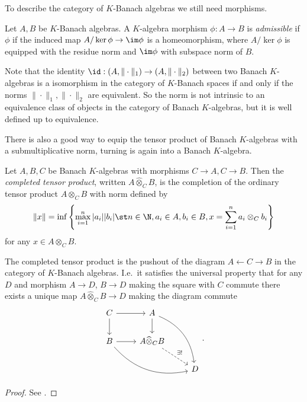 To describe the category of $K$-Banach algebras we still need morphisms.
\begin{definition}
	Let $A, B$ be $K$-Banach algebras. 
	A $K$-algebra morphism $\phi: A \to B$ is \emph{admissible} if $\phi$ if the induced map $A / \ker \phi \to \im \phi$ is a homeomorphism, where $A / \ker \phi$ is equipped with the residue norm and $\im \phi$ with subspace norm of $B$. 
\end{definition}

\begin{remark}\label{rem:uniqueness_norm_banach_algebra}
	Note that the identity  $\id: (A, \|\cdot \|_1) \to (A, \|\cdot \|_2)$ between two Banach $K$-algebras is a isomorphism in the category of $K$-Banach spaces if and only if the norms $\|\cdot \|_1, \|\cdot \|_2$ are equivalent. 
	So the norm is not intrinsic to an equivalence class of objects in the category of Banach  $K$-algebras, but it is well defined up to equivalence. 
\end{remark}

There is also a good way to equip the tensor product of Banach $K$-algebras with a submultiplicative norm, turning is again into a Banach $K$-algebra.
\begin{definition}
	Let $A, B, C$ be Banach $K$-algebras with morphisms  $C\to A, C \to B$. Then the \emph{completed tensor product}, written $A \widehat \otimes_C B$, is the completion of the ordinary tensor product $A \otimes_C B$ with norm defined by \[
		\|x\| = \inf \left\{\max_{i = 1}^{n} |a_i||b_i|  \st n \in \N, a_i \in A, b_i \in B, x = \sum_{i = 1}^{n} a_i \otimes_C b_i\right\} 
	\] 
	for any $x \in A \otimes_C B$. 
\end{definition}

\begin{proposition}\label{prop:universal_prop_complete_tensor}
	The completed tensor product is the pushout of the diagram $A \leftarrow C \to B$ in the category of  $K$-Banach algebras. I.e.\ it satisfies the universal property that for any  $D$ and morphism $A \to D$,  $B \to D$ making the square with $C$ commute there exists a unique map $A \widehat\otimes_C B \to D$ making the diagram commute\[
	\begin{tikzcd}
		C \rar \dar & A \dar \ar[bend left]{rdd} \\
		B \rar \ar[bend right]{drr} &  A \widehat{\otimes}_C B \ar[dashed]{dr}{\exists !} \\
		 & & D
	\end{tikzcd}
	.\] 
\end{proposition}
\begin{proof}
	See \cite[][section 2.1.7]{siegfriedboschNonArchimedeanAnalysisSystematic1984}. 
\end{proof}

